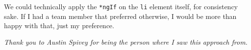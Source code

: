 We could technically apply the \lstinline{*ngIf} on the \lstinline{li} element 
itself, for consistency sake. If I had a team member that preferred otherwise, 
I would be more than happy with that, just my preference. 

\textit{Thank you to Austin Spivey for being the person where I saw this 
approach from.}